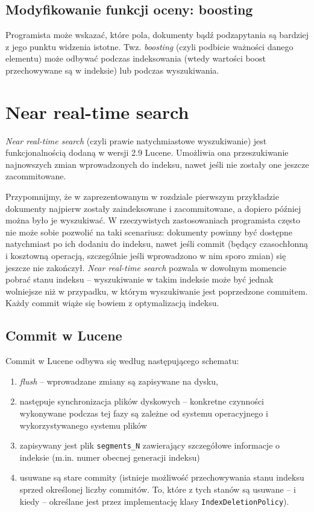 \subsection{Modyfikowanie funkcji oceny: boosting}

Programista może wskazać, które pola, dokumenty bądź podzapytania są bardziej z jego punktu widzenia istotne. Twz. \emph{boosting} (czyli podbicie ważności danego elementu) może odbywać podczas indeksowania (wtedy wartości boost przechowywane są w indeksie) lub podczas wyszukiwania. 

\section{Near real-time search}

\emph{Near real-time search} (czyli prawie natychmiastowe wyszukiwanie) jest funkcjonalnością dodaną w wersji 2.9 Lucene. Umożliwia ona przeszukiwanie najnowszych zmian wprowadzonych do indeksu, nawet jeśli nie zostały one jeszcze zacommitowane. 

Przypomnijmy, że w zaprezentowanym w rozdziale pierwszym przykładzie dokumenty najpierw zostały zaindeksowane i zacommitowane, a dopiero później można było je wyszukiwać. W rzeczywistych zastosowaniach programista często nie może sobie pozwolić na taki scenariusz: dokumenty powinny być dostępne natychmiast po ich dodaniu do indeksu, nawet jeśli commit (będący czasochłonną i kosztowną operacją, szczególnie jeśli wprowadzono w nim sporo zmian) się jeszcze nie zakończył. \emph{Near real-time search} pozwala w dowolnym momencie pobrać stanu indeksu -- wyszukiwanie w takim indeksie może być jednak wolniejsze niż w przypadku, w którym wyszukiwanie jest poprzedzone commitem. Każdy commit wiąże się bowiem z optymalizacją indeksu.

\subsection{Commit w Lucene}

Commit w Lucene odbywa się według następującego schematu:
\begin{enumerate}
 \item \emph{flush} -- wprowadzane zmiany są zapisywane na dysku,
 \item następuje synchronizacja plików dyskowych -- konkretne czynności wykonywane podczas tej fazy są zależne od systemu operacyjnego i wykorzystywanego systemu plików
 \item zapisywany jest plik \texttt{segments\_N} zawierający szczegółowe informacje o indeksie (m.in. numer obecnej generacji indeksu)
 \item usuwane są stare commity (istnieje możliwość przechowywania stanu indeksu sprzed określonej liczby commitów. To, które z tych stanów są usuwane -- i kiedy -- określane jest przez implementację klasy \texttt{IndexDeletionPolicy}).
\end{enumerate}

